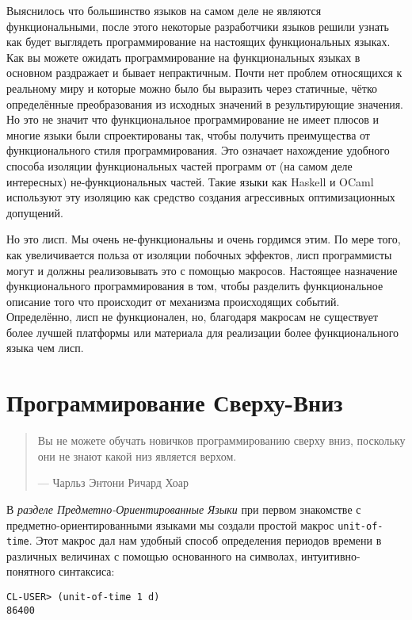 Выяснилось что большинство языков на самом деле не являются функциональными, после этого некоторые разработчики языков решили узнать как будет выглядеть программирование на настоящих функциональных языках. Как вы можете ожидать программирование на функциональных языках в основном раздражает и бывает непрактичным. Почти нет проблем относящихся к реальному миру и которые можно было бы выразить через статичные, чётко определённые преобразования из исходных значений в результирующие значения. Но это не значит что функциональное программирование не имеет плюсов и многие языки были спроектированы так, чтобы получить преимущества от функционального стиля программирования. Это означает нахождение удобного способа изоляции функциональных частей программ от (на самом деле интересных) не-функциональных частей. Такие языки как Haskell и OCaml используют эту изоляцию как средство создания агрессивных оптимизационных допущений. 

Но это лисп. Мы очень не-функциональны и очень гордимся этим. По мере того, как увеличивается польза от изоляции побочных эффектов, лисп программисты могут и должны реализовывать это с помощью макросов. Настоящее назначение функционального программирования в том, чтобы разделить функциональное описание того что происходит от механизма происходящих событий. Определённо, лисп не функционален, но, благодаря макросам не существует более лучшей платформы или материала для реализации более функционального языка чем лисп.

\section{Программирование Сверху-Вниз}\label{section_top-down_programming}

\begin{quote}
Вы не можете обучать новичков программированию сверху вниз, поскольку они не знают какой низ является верхом.

--- Чарльз Энтони Ричард Хоар
\end{quote}

В \emph{разделе Предметно-Ориентированные Языки} при первом знакомстве с предметно-ориентированными языками мы создали простой макрос \verb"unit-of-time". Этот макрос дал нам удобный способ определения периодов времени в различных величинах с помощью основанного на символах, интуитивно-понятного синтаксиса:

\begin{verbatim}
CL-USER> (unit-of-time 1 d)
86400
\end{verbatim}

